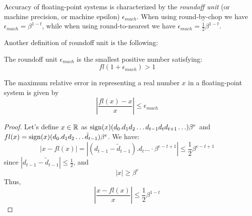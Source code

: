 \begin{definition}
    Accuracy of floating-point systems is characterized by the \textit{roundoff unit} (or machine precision, or machine epsilon) $\epsilon_{mach}$. When using round-by-chop we have $\epsilon_{mach} = \beta^{1-t}$, while when using round-to-nearest we have $\epsilon_{mach} = \frac{1}{2}\beta^{1-t}$.
\end{definition}

Another definition of roundoff unit is the following:
\begin{definition}
    The roundoff unit $\epsilon_{mach}$ is the smallest positive number satisfying:
    $$ fl(1+\epsilon_{mach}) > 1 $$
\end{definition}

\begin{proposition}
    The maximum relative error in representing a real number $x$ in  a floating-point system is given by
    $$ \left| \frac{fl(x) - x}{x} \right| \leq \epsilon_{mach} $$
\end{proposition}

\begin{proof}
    Let's define $x \in \mathbb{R}$ as $\mathrm{sign}(x)(d_0.d_1d_2 \hdots d_{t-1}d_{t}d_{t+1} \hdots)\beta^{e}$ and $fl(x) = \mathrm{sign}(x)(d_0.d_1d_2 \hdots \tilde{d}_{t-1})\beta^{e}$. We have:
    $$ |x - fl(x)| = |(d_{t-1}-\tilde{d}_{t-1}).d_{t} \hdots \cdot \beta^{e-t+1}| \leq \frac{1}{2}\beta^{e-t+1} $$
    since $|d_{t-1} - \tilde{d}_{t-1}| \leq \frac{1}{2}$, and
    $$ |x| \geq \beta^{e} $$
    Thus,
    $$ \left| \frac{x-fl(x)}{x} \right| \leq \frac{1}{2}\beta^{1-t} $$
\end{proof}